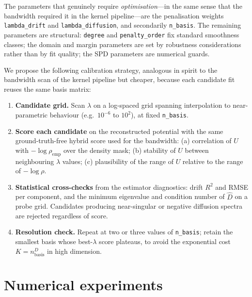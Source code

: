 \documentclass[11pt,a4paper]{article}
\begin{document}
The parameters that genuinely require \emph{optimisation}---in the same sense
that the bandwidth required it in the kernel pipeline---are the penalisation
weights \texttt{lambda\_drift} and \texttt{lambda\_diffusion}, and secondarily
\texttt{n\_basis}. The remaining parameters are structural: \texttt{degree}
and \texttt{penalty\_order} fix standard smoothness classes; the domain and
margin parameters are set by robustness considerations rather than by fit
quality; the SPD parameters are numerical guards.

We propose the following calibration strategy, analogous in spirit to the
bandwidth scan of the kernel pipeline but cheaper, because each candidate fit
reuses the same basis matrix:

\begin{enumerate}
\item \textbf{Candidate grid.} Scan $\lambda$ on a log-spaced grid spanning
interpolation to near-parametric behaviour (e.g.\ $10^{-6}$ to $10^{2}$), at
fixed \texttt{n\_basis}.
\item \textbf{Score each candidate} on the reconstructed potential with the
same ground-truth-free hybrid score used for the bandwidth: (a) correlation
of $U$ with $-\log\rho_{\mathrm{emp}}$ over the density mask; (b) stability of
$U$ between neighbouring $\lambda$ values; (c) plausibility of the range of
$U$ relative to the range of $-\log\rho$.
\item \textbf{Statistical cross-checks} from the estimator diagnostics: drift
$R^2$ and RMSE per component, and the minimum eigenvalue and condition number
of $\hat D$ on a probe grid. Candidates producing near-singular or negative
diffusion spectra are rejected regardless of score.
\item \textbf{Resolution check.} Repeat at two or three values of
\texttt{n\_basis}; retain the smallest basis whose best-$\lambda$ score
plateaus, to avoid the exponential cost $K = n_{\text{basis}}^D$ in high
dimension.
\end{enumerate}


\section{Numerical experiments}
\label{sec:experiments}
\end{document}
